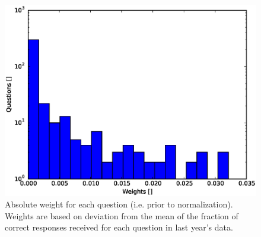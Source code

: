 \documentclass[twoside,11pt, letter]{article}
\newcommand{\1}[1]{\, \mathrm{#1}} %
\begin{document}
\begin{figure}
\begin{center}
\includegraphics[scale=0.4]{plots/weights.eps}
\caption{Absolute weight for each question (i.e. prior to normalization).  Weights are based on deviation from the mean of the fraction of correct responses received for each question in last year's data.}
\end{center}
\end{figure}
\end{document}
